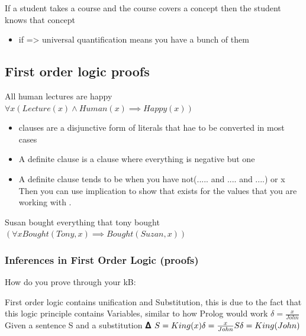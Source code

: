 \documentclass{article}
\theoremstyle{mytheoremstyle}
\theoremstyle{mytheoremstyle}
\theoremstyle{myproblemstyle}
\begin{document}
If a student takes a course and the course covers a concept then the student knows that concept
\begin{itemize}
	\item if => universal quantification means you have a bunch of them
\end{itemize}

\subsection{First order logic proofs}
All human lectures are happy
\begin{math}
	\forall x (Lecture(x) \land Human(x) \implies  Happy(x))
\end{math}
\begin{itemize}
	\item clauses are a disjunctive form of literals that hae to be converted in most cases
	\item A definite clause is a clause where everything is negative but one
	\item A definite clause tends to be when you have not(..... and  .... and ....) or x
	      Then you can use implication to show that exists for the values that you are working with .
\end{itemize}

Susan bought everything that tony bought
\begin{math}
	(\forall x Bought(Tony, x) \implies  Bought(Suzan,x))
\end{math}


\subsubsection{Inferences in First Order Logic (proofs)}

How do you prove through your kB:

\begin{definition}[Subsitution]
	First order logic contains unification and Substitution, this is due to the fact that this logic principle contains Variables, similar to how Prolog would work
	\begin{math}
		\delta  = {\frac{x}{John}}
	\end{math}
	Given a sentence S and a substitution 𝚫
	\begin{math}
		\\
		S = King(x) \\
		\delta = {{\frac{x}{John}}}\\
		S\delta  = King(John)
	\end{math}
\end{definition}
\end{document}
